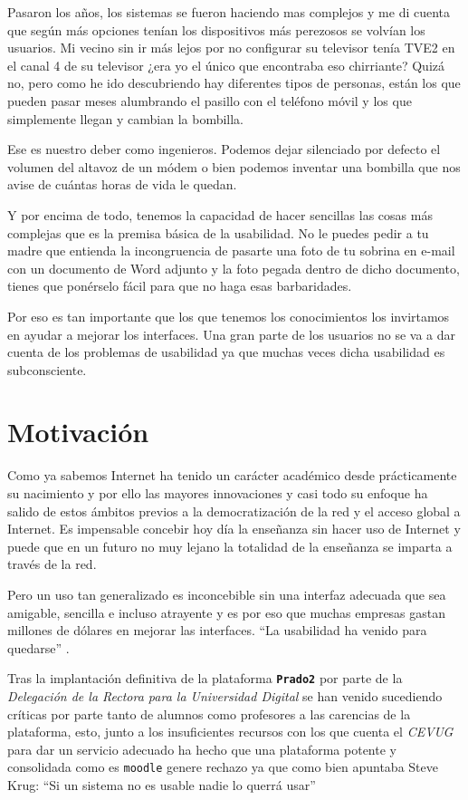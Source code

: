 \bigskip
Pasaron los años, los sistemas se fueron haciendo mas complejos y me di cuenta que según más opciones tenían los dispositivos más perezosos se volvían los usuarios. Mi vecino sin ir más lejos por no configurar su televisor tenía TVE2 en el canal 4 de su televisor ¿era yo el único que encontraba eso chirriante? Quizá no, pero como he ido descubriendo hay diferentes tipos de personas, están los que pueden pasar meses alumbrando el pasillo con el teléfono móvil y los que simplemente llegan y cambian la bombilla.

\bigskip
Ese es nuestro deber como ingenieros. Podemos dejar silenciado por defecto el volumen del altavoz de un módem o bien podemos inventar una bombilla que nos avise de cuántas horas de vida le quedan.

\bigskip
Y por encima de todo, tenemos la capacidad de hacer sencillas las cosas más complejas que es la premisa básica de la usabilidad. No le puedes pedir a tu madre que entienda la incongruencia de pasarte una foto de tu sobrina en e-mail con un documento de Word adjunto y la foto pegada dentro de dicho documento, tienes que ponérselo fácil para que no haga esas barbaridades.

\bigskip
Por eso es tan importante que los que tenemos los conocimientos los invirtamos en ayudar a mejorar los interfaces. Una gran parte de los usuarios no se va a dar cuenta de los problemas de usabilidad ya que muchas veces dicha usabilidad es subconsciente.

\section{Motivación}

Como ya sabemos Internet ha tenido un carácter académico desde prácticamente su nacimiento y por ello las mayores innovaciones y casi todo su enfoque ha salido de estos ámbitos previos a la democratización de la red y el acceso global a Internet. Es impensable concebir hoy día la enseñanza sin hacer uso de Internet y puede que en un futuro no muy lejano la totalidad de la enseñanza se imparta a través de la red.

\bigskip
Pero un uso tan generalizado es inconcebible sin una interfaz adecuada que sea amigable, sencilla e incluso atrayente y es por eso que muchas empresas gastan millones de dólares en mejorar las interfaces. ``La usabilidad ha venido para quedarse'' \cite{jakonielsen}.

\bigskip
Tras la implantación definitiva de la plataforma \textbf{\texttt{Prado2}} por parte de la \textit{Delegación de la Rectora para la Universidad Digital} se han venido sucediendo críticas por parte tanto de alumnos como profesores a las carencias de la plataforma, esto, junto a los insuficientes recursos con los que cuenta el \textit{CEVUG} para dar un servicio adecuado ha hecho que una plataforma potente y consolidada como es \texttt{moodle} genere rechazo ya que como bien apuntaba Steve Krug: ``Si un sistema no es usable nadie lo querrá usar''\cite{stevekrug}


